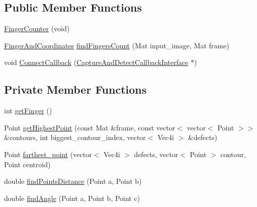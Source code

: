 \subsection*{Public Member Functions}
\begin{DoxyCompactItemize}
\item 
\hyperlink{class_gesture_detection_1_1_finger_counter_a2f6f5bc97506e87dc7acc6e02579a916}{Finger\+Counter} (void)
\item 
\hyperlink{class_gesture_detection_1_1_finger_and_coordinates}{Finger\+And\+Coordinates} \hyperlink{class_gesture_detection_1_1_finger_counter_a611201352a86dd943f866c1be9507081}{find\+Fingers\+Count} (Mat input\+\_\+image, Mat frame)
\item 
void \hyperlink{class_gesture_detection_1_1_finger_counter_a5b5aabaa39ff05c70a873b4c2a7869f9}{Connect\+Callback} (\hyperlink{class_gestro_1_1_capture_and_detect_callback_interface}{Capture\+And\+Detect\+Callback\+Interface} $\ast$)
\end{DoxyCompactItemize}
\subsection*{Private Member Functions}
\begin{DoxyCompactItemize}
\item 
int \hyperlink{class_gesture_detection_1_1_finger_counter_ab8a8c1f8ddc9eda04ac2bb16820c4c14}{get\+Finger} ()
\item 
Point \hyperlink{class_gesture_detection_1_1_finger_counter_a54c1d13833b837d08bcd45c489494370}{get\+Highest\+Point} (const Mat \&frame, const vector$<$ vector$<$ Point $>$$>$ \&contours, int biggest\+\_\+contour\+\_\+index, vector$<$ Vec4i $>$ \&defects)
\item 
Point \hyperlink{class_gesture_detection_1_1_finger_counter_a89bf2a26694a8d7f826e88d73d9ba03f}{farthest\+\_\+point} (vector$<$ Vec4i $>$ defects, vector$<$ Point $>$ contour, Point centroid)
\item 
double \hyperlink{class_gesture_detection_1_1_finger_counter_a51fdf57f5f19911f34778e925d50b480}{find\+Points\+Distance} (Point a, Point b)
\item 
double \hyperlink{class_gesture_detection_1_1_finger_counter_aebba4b98a6332a74ba996536ca080dbb}{find\+Angle} (Point a, Point b, Point c)
\end{DoxyCompactItemize}
